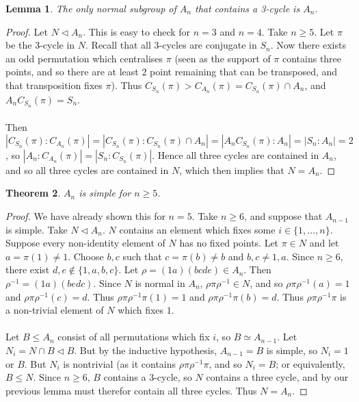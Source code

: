 \documentclass[a4paper,10pt]{article}
\newtheorem{thm}{Theorem}
\newtheorem{Lem}[thm]{Lemma}
\begin{document}
\begin{Lem}
The only normal subgroup of $A_n$ that contains a 3-cycle is $A_n$.
\end{Lem}


\begin{proof}
Let $N \triangleleft A_n$. This is easy to check for $n =3$ and $n=4$. Take $n \geq 5$. Let $\pi$ be the $3$-cycle in $N$. Recall that all $3$-cycles are conjugate in $S_n$. Now there exists an odd permutation which centralises $\pi$ (seen as the support of $\pi$ contains three points, and so there are at least 2 point remaining that can be transposed, and that transposition fixes $\pi$). Thus $C_{S_n}(\pi)  > C_{A_n}(\pi) = C_{S_n}(\pi) \cap A_n$, and $A_n C_{S_n}(\pi) = S_n$. \\
\\
Then $| C_{S_n}(\pi) : C_{A_n}(\pi) | = |C_{S_n}(\pi) : C_{S_n}(\pi) \cap A_n | = | A_n C_{S_n}(\pi) : A_n | = |S_n : A_n| = 2$, so $|A_n : C_{A_n}(\pi)| = |S_n : C_{S_n}(\pi)|$. Hence all three cycles are contained in $A_n$, and so all three cycles are contained in $N$, which then implies that $N = A_n$. 
\end{proof}


\begin{thm}
$A_n$ is simple for $n \geq 5$. 
\end{thm}

\begin{proof}
We have already shown this for $n = 5$. Take $n \geq 6$, and suppose that $A_{n-1}$ is simple. Take $N \triangleleft A_n$. $N$ contains an element which fixes some $i \in \{1, \dots, n\}$. Suppose every non-identity element of $N$ has no fixed points. Let $\pi \in N$ and let $a = \pi(1) \neq 1$. Choose $b,c$ such that $c = \pi(b) \neq b$ and $b,c \neq 1,a$. Since $n \geq 6$, there exist $d,e \notin \{ 1,a,b,c \}$. Let $\rho = (1a)(bcde) \in A_n$. Then $\rho^{-1} = (1a)(bedc)$. Since $N$ is normal in $A_n$, $\rho \pi \rho^{-1} \in N$, and so $\rho \pi \rho^{-1} (a) = 1$ and $\rho \pi  \rho^{-1} (c) = d$. Thus $\rho \pi \rho^{-1} \pi (1) = 1$ and $\rho \pi \rho^{-1} \pi (b) = d$. Thus $\rho \pi \rho^{-1} \pi$ is a non-trivial element of $N$ which fixes $1$. \\
\\
Let $B \leq A_n$ consist of all permutations which fix $i$, so $B \simeq A_{n-1}$. Let $N_i  = N \cap B \triangleleft B$. But by the inductive hypothesis, $A_{n-1} = B$ is simple, so $N_i = 1$ or $B$. But $N_i$ is nontrivial (as it contains $\rho \pi \rho^{-1} \pi$, and so $N_i = B$; or equivalently, $B \leq N$. Since $n \geq 6$, $B$ contains a $3$-cycle, so $N$ contains a three cycle, and by our previous lemma must therefor contain all three cycles. Thus $N = A_n$. 
\end{proof}
\end{document}
